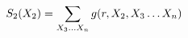 \documentclass[preview]{standalone}
\begin{document}
\begin{align*}
\special{dvisvgm:raw <g id='unique000'>}S_2(X_2) = \sum_{X_3 \ldots X_n} g(r, X_2, X_3 \ldots X_n)\special{dvisvgm:raw </g>}
\end{align*}
\end{document}
